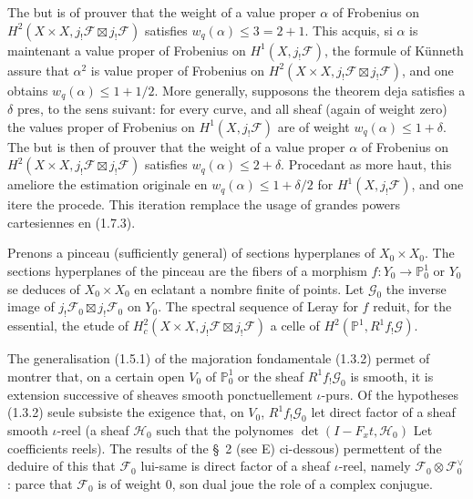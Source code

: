 \documentclass[12pt,a4paper]{article}
\theoremstyle{plain}
\theoremstyle{definition}
\theoremstyle{definition}
\theoremstyle{remark}
\begin{document}
The but is of prouver that the weight of a value proper $\alpha$ of Frobenius on $H^2(X \times X, j_! \mathscr{F} \boxtimes j_! \mathscr{F})$ satisfies $w_q(\alpha) \leq 3 = 2+1$. This acquis, si $\alpha$ is maintenant a value proper of Frobenius on $H^1(X, j_! \mathscr{F})$, the formule of K\"unneth assure that $\alpha^2$ is value proper of Frobenius on $H^2(X \times X, j_! \mathscr{F} \boxtimes j_! \mathscr{F})$, and one obtains $w_q(\alpha) \leq 1+1/2$. More generally, supposons the theorem deja satisfies a $\delta$ pres, to the sens suivant: for every curve, and all sheaf (again of weight zero) the values proper of Frobenius on $H^1(X, j_! \mathscr{F})$ are of weight $w_q(\alpha) \leq 1+\delta$. The but is then of prouver that the weight of a value proper $\alpha$ of Frobenius on $H^2(X \times X, j_! \mathscr{F} \boxtimes j_! \mathscr{F})$ satisfies $w_q(\alpha) \leq 2+\delta$. Procedant as more haut, this ameliore the estimation originale en $w_q(\alpha) \leq 1+\delta/2$ for $H^1(X, j_! \mathscr{F})$, and one itere the procede. This iteration remplace the usage of grandes powers cartesiennes en (1.7.3).

Prenons a pinceau (sufficiently general) of sections hyperplanes of $X_0 \times X_0$. The sections hyperplanes of the pinceau are the fibers of a morphism $f: Y_0 \to \mathbb{P}_0^1$ or $Y_0$ se deduces of $X_0 \times X_0$ en eclatant a nombre finite of points. Let $\mathscr{G}_0$ the inverse image of $j_! \mathscr{F}_0 \boxtimes j_! \mathscr{F}_0$ on $Y_0$. The spectral sequence of Leray for $f$ reduit, for the essential, the etude of $H_c^2(X \times X, j_! \mathscr{F} \boxtimes j_! \mathscr{F})$ a celle of $H^2(\mathbb{P}^1, R^1 f_! \mathscr{G})$.

The generalisation (1.5.1) of the majoration fondamentale (1.3.2) permet of montrer that, on a certain open $V_0$ of $\mathbb{P}_0^1$ or the sheaf $R^1 f_! \mathscr{G}_0$ is smooth, it is extension successive of sheaves smooth ponctuellement $\iota$-purs. Of the hypotheses (1.3.2) seule subsiste the exigence that, on $V_0$, $R^1 f_! \mathscr{G}_0$ let direct factor of a sheaf smooth $\iota$-reel (a sheaf $\mathscr{H}_0$ such that the polynomes $\det(I - F_x t, \mathscr{H}_0)$ Let coefficients reels). The results of the \S~2 (see E) ci-dessous) permettent of the deduire of this that $\mathscr{F}_0$ lui-same is direct factor of a sheaf $\iota$-reel, namely $\mathscr{F}_0 \otimes \mathscr{F}_0^\vee$: parce that $\mathscr{F}_0$ is of weight $0$, son dual joue the role of a complex conjugue.
\end{document}

